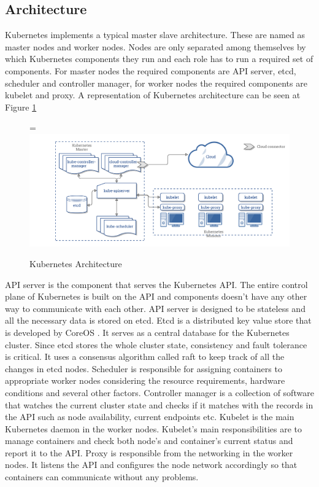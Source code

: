 \documentclass[12pt,oneandhalf,chaparabic,ceng,ms,eng,oneside,pntc]{gsufbe}
\makeatletter
\let\old@includegraphics\includegraphics
\renewcommand{\includegraphics}[2][,]{%
  \setbox9=\hbox{\old@includegraphics[#1]{#2}}%
  \ifdim\wd9>\textwidth
    \old@includegraphics[#1,width=\textwidth]{#2}%
  \else
    \old@includegraphics[#1]{#2}%
  \fi%
}
\makeatother
\begin{document}
\subsection{Architecture}
Kubernetes implements a typical master slave architecture.  These are named as master nodes and worker
nodes.  Nodes are only separated among themselves by which Kubernetes components they run and each role 
has to run a required set of components.  For master nodes the required components are API server, etcd,
scheduler and
controller manager, for worker nodes the required components are kubelet and proxy.  A representation
of Kubernetes architecture can be seen at Figure \ref{fig:k8sarch}

\begin{figure}
\centering
\includegraphics[]{k8s-arch.png}
\caption{Kubernetes Architecture \cite{kube_arch}}
\label{fig:k8sarch}
\end{figure}

API server is the component that serves the Kubernetes API.  The entire control plane of Kubernetes is
built on the API and components doesn't have any other way to communicate with each other.  API server
is designed to be stateless and all the necessary data is stored on etcd.
Etcd is a distributed key value store that is developed by CoreOS \cite{coreos}.  It serves as a central database for
the Kubernetes cluster.  Since etcd stores the whole cluster state, consistency and fault tolerance is
critical.  It uses a consensus algorithm called raft \cite{raft} to keep track of all the changes in etcd nodes.
Scheduler is responsible for assigning containers to appropriate worker nodes considering the resource
requirements, hardware conditions and several other factors.
Controller manager is a collection of software that watches the current cluster state and checks if it
matches with the records in the API such as node availability, current endpoints etc.
Kubelet is the main Kubernetes daemon in the worker nodes.  Kubelet's main responsibilities are to 
manage containers and check both node's and container's current status and report it to the API.
Proxy is responsible from the networking in the worker nodes.  It listens the API and configures the
node network accordingly so that containers can communicate without any problems.
\end{document}
